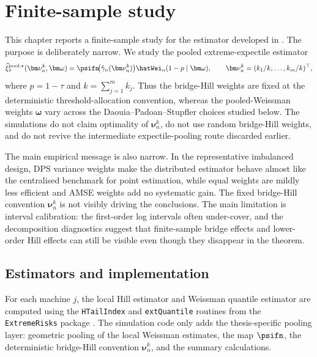\chapter{Finite-sample study}
\label{ch:finite-sample}

This chapter reports a finite-sample study for the estimator developed in
. The purpose is deliberately narrow. We study the
pooled extreme-expectile estimator
\[
  \widehat\xi_{\tau}^{\mathrm{pool},\star}
    (\bm\nu_n^k,\bm\omega)
  =
  \psifn\!\big(\hat\gamma_n(\bm\nu_n^k)\big)
  \hatWei_n(1-p\mid\bm\omega),
  \qquad
  \bm\nu_n^k=(k_1/k,\ldots,k_m/k)^\top,
\]
where \(p=1-\tau\) and \(k=\sum_{j=1}^{m}k_j\). Thus the bridge-Hill
weights are fixed at the deterministic threshold-allocation convention,
whereas the pooled-Weissman weights \(\bm\omega\) vary across the
Daouia--Padoan--Stupfler choices studied below. The simulations do not claim
optimality of \(\bm\nu_n^k\), do not use random bridge-Hill weights, and do
not revive the intermediate expectile-pooling route discarded earlier.

The main empirical message is also narrow. In the representative imbalanced
design, DPS variance weights make the distributed estimator behave almost like
the centralised benchmark for point estimation, while equal weights are mildly
less efficient and AMSE weights add no systematic gain. The fixed bridge-Hill
convention \(\bm\nu_n^k\) is not visibly driving the conclusions. The main
limitation is interval calibration: the first-order log intervals often
under-cover, and the decomposition diagnostics suggest that finite-sample
bridge effects and lower-order Hill effects can still be visible even though
they disappear in the theorem.

\section{Estimators and implementation}
\label{sec:sim:estimators}

For each machine \(j\), the local Hill estimator and Weissman quantile
estimator are computed using the \texttt{HTailIndex} and \texttt{extQuantile}
routines from the \texttt{ExtremeRisks} package \parencite{ExtremeRisksR}.
The simulation code only adds the thesis-specific pooling layer: geometric
pooling of the local Weissman estimates, the map \(\psifn\), the deterministic
bridge-Hill convention \(\bm\nu_n^k\), and the summary calculations.

